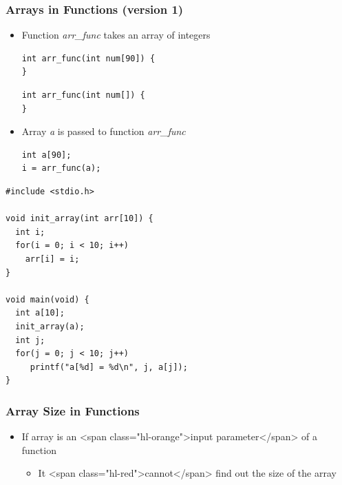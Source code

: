 \documentclass{../c-lecture}
\begin{document}
\begin{frame}[fragile]
  \frametitle{Arrays in Functions (version 1)}
  \begin{itemize}
    \item
      Function \textit{\color{Orange} arr_func} takes an array of
      integers

    \begin{verbatim}
int arr_func(int num[90]) {
}
    \end{verbatim}
    \begin{verbatim}
int arr_func(int num[]) {
}
    \end{verbatim}
    \item
      Array \textit{\color{Orange}a} is passed to function
      \textit{\color{Orange} arr_func}

    \begin{verbatim}
int a[90];
i = arr_func(a);
    \end{verbatim}
  \end{itemize}
\end{frame}

\begin{frame}
  \begin{verbatim}
#include <stdio.h>

void init_array(int arr[10]) {
  int i;
  for(i = 0; i < 10; i++)
    arr[i] = i;
}

void main(void) {
  int a[10];
  init_array(a);
  int j;
  for(j = 0; j < 10; j++)
     printf("a[%d] = %d\n", j, a[j]);
}
  \end{verbatim}
\end{frame}

\begin{frame}
  \frametitle{Array Size in Functions}
  \begin{itemize}
    \item
      If array is an <span class="hl-orange">input parameter</span> of a
      function
    \begin{itemize}
      \item
        It <span class="hl-red">cannot</span> find out the size of the array
    \end{itemize}
  \end{itemize}
\end{frame}
\end{document}
